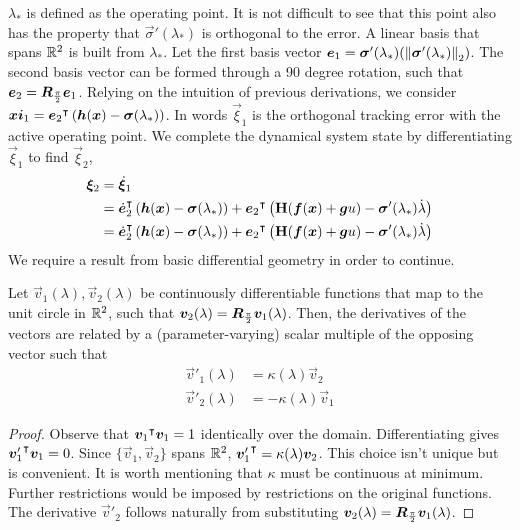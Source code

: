 \documentclass[oneside, 11pt]{book}
\begin{document}
$\lambda_*$ is defined as the operating point. It is not difficult to see that this point also has the property that $\vec{\sigma}'(\lambda_*)$ is orthogonal to the error. A linear basis that spans $\mathbb{R}^2$ is built from $\lambda_*$. Let the first basis vector $\bm{e}_1 = \bm{\sigma}'(\lambda_*)(\left\|\bm{\sigma}'(\lambda_*)\right\|_2)$. The second basis vector can be formed through a 90 degree rotation, such that $\bm{e}_2 = \bm{R}_{\frac{\pi}{2}}\bm{e}_1$. Relying on the intuition of previous derivations, we consider $\bm{xi}_1 = {\bm{e}_2}^{\intercal}\left(\bm{h}(\bm{x}) - \bm{\sigma}(\lambda_*)\right)$. In words $\vec{\xi}_1$ is the orthogonal tracking error with the active operating point. We complete the dynamical system state by differentiating $\vec{\xi}_1$ to find $\vec{\xi}_2$,
\begin{align*}
    \bm{\xi}_2     &=  \dot{\bm{\xi}}_1\\
                    &=  {\dot{\bm{e}}_2}^{\intercal}\left(\bm{h}(\bm{x}) - \bm{\sigma}(\lambda_*)\right)
                        +
                        {\bm{e}_2}^{\intercal}\left(\mathbf{H}(\bm{f}(\bm{x}) + \bm{g}u) - \bm{\sigma}'(\lambda_*)\dot{\lambda} \right)\\
                    &=  {\dot{\bm{e}}_2}^{\intercal}\left(\bm{h}(\bm{x}) - \bm{\sigma}(\lambda_*)\right)
                        +
                        {\bm{e}_2}^{\intercal}\left(\mathbf{H}(\bm{f}(\bm{x}) + \bm{g}u) - \bm{\sigma}'(\lambda_*)\dot{\lambda} \right)
\end{align*}
We require a result from basic differential geometry in order to continue.
\begin{lemma}
    Let $\vec{v}_1(\lambda), \vec{v}_2(\lambda)$ be continuously differentiable functions that map to the unit circle in $\mathbb{R}^2$, such that $\bm{v}_2(\lambda)=\bm{R}_{\frac{\pi}{2}}\bm{v}_1(\lambda)$. Then, the derivatives of the vectors are related by a (parameter-varying) scalar multiple of the opposing vector such that
    \begin{align*}
        \vec{v}'_1(\lambda) &= \kappa(\lambda)\vec{v}_2 \\
        \vec{v}'_2(\lambda) &= -\kappa(\lambda)\vec{v}_1
    \end{align*}
    \label{lem:sf_frame}
\end{lemma}
\begin{proof}
    Observe that ${\bm{v}_1}^{\intercal}\bm{v}_1=1$ identically over the domain. Differentiating gives ${\bm{v}'_1}^{\intercal}\bm{v}_1=0$. Since $\{\vec{v}_1,\vec{v}_2\}$ spans $\mathbb{R}^2$, ${\bm{v}'_1}^{\intercal}=\kappa(\lambda)\bm{v}_2$. This choice isn't unique but is convenient. It is worth mentioning that $\kappa$ must be continuous at minimum. Further restrictions would be imposed by restrictions on the original functions. The derivative $\vec{v}'_2$ follows naturally from substituting $\bm{v}_2(\lambda)=\bm{R}_{\frac{\pi}{2}}\bm{v}_1(\lambda)$.
\end{proof}
\end{document}
